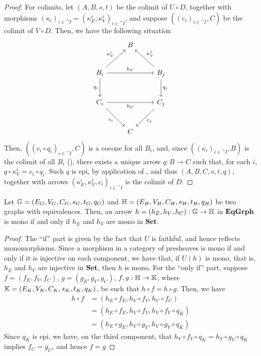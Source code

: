 \begin{proof}
     For colimits, let $(A, B, s, t)$ be the colimit of $U \circ D$, together with morphisms $(\kappa_i)_{i \in \cat I} = (\kappa_E^i, \kappa_V^i)_{i \in \cat I}$, and suppose $((c_i)_{i \in \cat I}, C)$ be the colimit of $V \circ D$. Then, we have the following situation
     \[
	     \begin{tikzcd}[row sep = 25, column sep=25]
			& B & \\
			B_i \ar[rr, "{h_V}"] \ar[ur, "{\kappa_V^i}"] \ar[d, "{q_i}"swap] & & B_j \ar[ul, "{\kappa_V^j}"swap] \ar[d, "q_j"] \\
			C_i \ar[rr, "{h_C}" swap] \ar[dr, "{c_i}"swap] & & C_j \ar[dl, "{c_j}"] \\
			& C &
		\end{tikzcd}
     \]
     Then, $((c_i \circ q_i)_{i \in \cat I}, C)$ is a cocone for all $B_i$, and, since $((\kappa_i)_{i \in \cat I}, B)$ is the colimit of all $B_i$ (), there exists a unique arrow $q: B \to C$ such that, for each $i$, $q \circ \kappa_V^i = c_i \circ q_i$. Such $q$ is epi, by application of , and thus $(A, B, C, s, t, q)$, together with arrows $(\kappa_E^i, \kappa_V^i, c_i)_{i \in \cat I}$ is the colimit of $D$.

\end{proof}

\begin{cor}\label{cor:mono_in_EqGrph}
    Let $\mathbb{G} = (E_G, V_G, C_G, s_G, t_G, q_G)$ and $\mathbb{H} = (E_H, V_H, C_H, s_H, t_H, q_H)$ be two graphs with equivalences. Then, an arrow $h = (h_E, h_V, h_C): \mathbb{G} \to \mathbb{H}$ in $\mathbf{EqGrph}$ is mono if and only if $h_E$ and $h_V$ are mono in $\mathbf{Set}$.
\end{cor}

\begin{proof}
    The ``if'' part is given by the fact that $U$ is faithful, and hence reflects monomorphisms. Since a morphism in a category of presheaves is mono if and only if it is injective on each component, we have that, if  $U(h)$ is mono, that is, $h_E$ and $h_V$ are injective in $\mathbf{Set}$, then $h$ is mono.
	For the ``only if'' part, suppose $f = (f_E, f_V, f_C)$, $g=(g_E, g_V, g_C)$, $f, g : \mathbb{H \to K}$, where $\mathbb{K} = (E_K, V_K, C_K, s_K, t_K, q_K)$, be such that $h \circ f = h \circ g$. Then, we have
    \begin{align*}
        h \circ f   &= (h_E \circ f_E, h_V \circ f_V, h_C \circ f_C) \\
                    &= (h_E \circ f_E, h_V \circ f_V, h_V \circ f_V \circ q_K) \\
                    &= (h_E \circ g_E, h_V \circ g_V, h_V \circ g_V \circ q_K)
    \end{align*}    
    Since $q_K$ is epi, we have, on the third component, that $h_V \circ f_V \circ q_K = h_V \circ g_V \circ q_K$ implies $f_C = g_C$, and hence $f = g$    
\end{proof}


